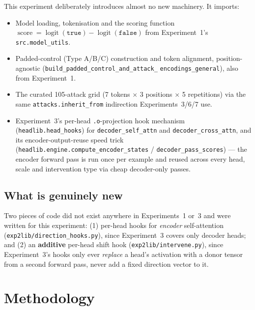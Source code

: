\documentclass[11pt]{article}
\newcommand{\score}{\operatorname{score}}
\begin{document}
This experiment deliberately introduces almost no new machinery. It imports:
\begin{itemize}[nosep]
  \item Model loading, tokenisation and the scoring function
        $\score = \operatorname{logit}(\texttt{true}) - \operatorname{logit}(\texttt{false})$
        from Experiment~1's \texttt{src.model\_utils}.
  \item Padded-control (Type A/B/C) construction and token alignment,
        position-agnostic (\texttt{build\_padded\_control\_and\_attack\_}
        \texttt{encodings\_general}), also from Experiment~1.
  \item The curated 105-attack grid (7 tokens $\times$ 3 positions $\times$
        5 repetitions) via the same \texttt{attacks.inherit\_from}
        indirection Experiments~3/6/7 use.
  \item Experiment~3's per-head \texttt{.o}-projection hook mechanism
        (\texttt{headlib.head\_hooks}) for \texttt{decoder\_self\_attn} and
        \texttt{decoder\_cross\_attn}, and its encoder-output-reuse speed
        trick (\texttt{headlib.engine.compute\_encoder\_states} /
        \texttt{decoder\_pass\_scores}) --- the encoder forward pass is run
        once per example and reused across every head, scale and
        intervention type via cheap decoder-only passes.
\end{itemize}

\subsection{What is genuinely new}

Two pieces of code did not exist anywhere in Experiments~1 or~3 and were
written for this experiment: (1) per-head hooks for
\emph{encoder} self-attention (\texttt{exp2lib/direction\_hooks.py}), since
Experiment~3 covers only decoder heads; and (2) an \textbf{additive}
per-head shift hook (\texttt{exp2lib/intervene.py}), since Experiment~3's
hooks only ever \emph{replace} a head's activation with a donor tensor from
a second forward pass, never add a fixed direction vector to it.

\section{Methodology}
\end{document}
